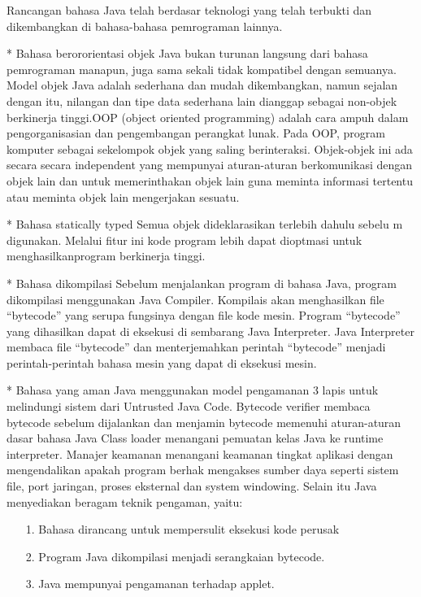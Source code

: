 \documentclass{jtetiproposalskripsi}
\begin{document}
Rancangan bahasa Java telah berdasar teknologi yang telah terbukti dan dikembangkan di bahasa-bahasa pemrograman lainnya.

*	Bahasa berororientasi objek
Java   bukan   turunan   langsung   dari   bahasa   pemrograman  manapun,   juga   sama sekali   tidak kompatibel  dengan semuanya.  Model  objek Java adalah sederhana dan  mudah  dikembangkan,   namun   sejalan  dengan   itu,  nilangan   dan  tipe   data sederhana lain dianggap sebagai non-objek berkinerja tinggi.OOP (object oriented programming) adalah cara ampuh dalam pengorganisasian dan   pengembangan   perangkat   lunak.   Pada  OOP,   program  komputer   sebagai sekelompok objek yang  saling berinteraksi.  Objek-objek  ini  ada  secara  secara independent yang mempunyai aturan-aturan berkomunikasi dengan objek lain dan untuk memerinthakan objek lain guna meminta informasi tertentu atau meminta objek lain mengerjakan sesuatu.

*	Bahasa statically typed
Semua objek dideklarasikan terlebih dahulu sebelu m digunakan. Melalui fitur ini kode program lebih dapat dioptmasi untuk menghasilkanprogram berkinerja tinggi.

*	Bahasa dikompilasi
Sebelum   menjalankan   program   di   bahasa   Java,   program   dikompilasi menggunakan Java Compiler. Kompilais akan menghasilkan file “bytecode” yang serupa fungsinya dengan file kode mesin.  Program “bytecode” yang dihasilkan dapat di eksekusi di sembarang Java Interpreter.  Java Interpreter  membaca file “bytecode” dan menterjemahkan perintah “bytecode” menjadi  perintah-perintah bahasa mesin yang dapat di eksekusi mesin.

*	Bahasa yang aman
Java menggunakan model pengamanan 3 lapis untuk melindungi sistem dari Untrusted Java Code.
	 Bytecode   verifier  membaca  bytecode  sebelum   dijalankan   dan menjamin bytecode memenuhi aturan-aturan dasar bahasa Java Class loader menangani pemuatan kelas Java ke runtime interpreter. Manajer   keamanan  menangani   keamanan   tingkat   aplikasi   dengan mengendalikan   apakah   program  berhak  mengakses   sumber   daya seperti   sistem  file,  port  jaringan,   proses   eksternal   dan   system windowing.
Selain itu Java menyediakan beragam teknik pengaman, yaitu:
\begin{itemize}

\item[1.] Bahasa dirancang untuk mempersulit eksekusi kode perusak
\item[2.] Program Java dikompilasi menjadi serangkaian bytecode.
\item[3.] Java mempunyai pengamanan terhadap applet.

\end{itemize}
\end{document}
